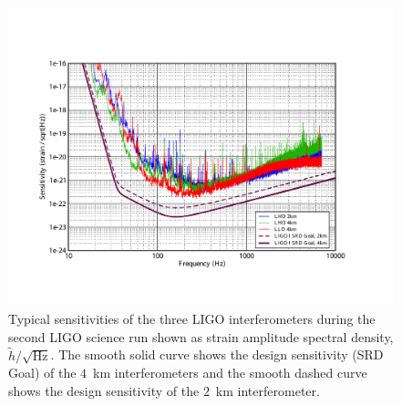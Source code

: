 \begin{figure}[p]
\vspace{5pt}
\begin{center}
\includegraphics[width=\textwidth]{figures/pipeline/G030379-00}    
\end{center}
\caption{\label{f:s2noisecurve}%
Typical sensitivities of the three LIGO interferometers during the second LIGO
science run\cite{s2noisecurve} shown as strain amplitude spectral density,
$\tilde{h}/\sqrt{\mathrm{Hz}}$. The smooth solid curve shows the design
sensitivity (SRD Goal) of the $4$~km interferometers and the smooth dashed
curve shows the design sensitivity of the $2$~km interferometer.
}
\end{figure}

